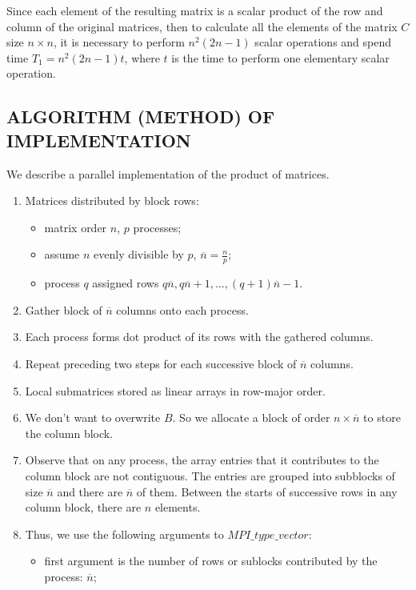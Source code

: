 Since each element of the resulting matrix is a scalar product of the row and column of the original matrices, then to calculate all the elements of the matrix $C$ size $n\times n$, it is necessary to perform $n^2(2n-1)$ scalar operations and spend time $T_1 = n^2(2n-1)t$, where $t$ is the time to perform one elementary scalar operation.

\subsection{ALGORITHM (METHOD) OF IMPLEMENTATION}\label{subsec:algorithm}

We describe a parallel implementation of the product of matrices.

\begin{enumerate}
    \item {
        Matrices distributed by block rows:
        \begin{itemize}
            \item matrix order $n$, $p$ processes;
            \item assume $n$ evenly divisible by $p$, $\overline{n} = \frac{n}{p}$;
            \item process $q$ assigned rows $q\overline{n}, q\overline{n} + 1, \dots, (q + 1)\overline{n} - 1$.
        \end{itemize}
    } \item Gather block of $\overline{n}$ columns onto each process.
    \item Each process forms dot product of its rows with the gathered columns.
    \item Repeat preceding two steps for each successive block of $\overline{n}$ columns.
    \item Local submatrices stored as linear arrays in row-major order.
    \item We don't want to overwrite $B$. So we allocate a block of order $n\times \overline{n}$ to store the column block.
    \item Observe that on any process, the array entries that it contributes to the column block are not contiguous. The entries are grouped into subblocks of size $\overline{n}$ and there are $\overline{n}$ of them. Between the starts of successive rows in any column block, there are $n$ elements.
    \item {
        Thus, we use the following arguments to $MPI\_type\_vector$:
        \begin{itemize}
            \item first argument is the number of rows or sublocks contributed by the process: $\overline{n}$;

\end{itemize}}
\end{enumerate}
